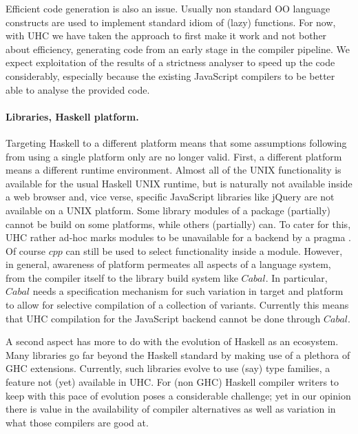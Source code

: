 \documentclass{llncs}
\newcommand{\Conid}[1]{\mathit{#1}}
\newcommand{\Varid}[1]{\mathit{#1}}
\begin{document}
Efficient code generation is also an issue.
Usually non standard OO language constructs are used to implement
standard idiom of (lazy) functions.
For now, with UHC we have taken the approach to first make it work and not bother about efficiency,
generating code from an early stage in the compiler pipeline.
We expect exploitation of the results of a strictness analyser to speed up the code considerably,
especially because the existing JavaScript compilers to be better able to analyse the provided code.

\paragraph{Libraries, Haskell platform.}

Targeting Haskell to a different platform means that some assumptions following
from using a single platform only are no longer valid.
First, a different platform means a different runtime environment.
Almost all of the UNIX functionality is available for the usual Haskell UNIX runtime, but is
naturally  not available inside a web browser
and, vice verse, specific JavaScript libraries like jQuery are not available on a UNIX platform.
Some library modules of a package (partially) cannot be build on some platforms, while others (partially) can.
To cater for this, UHC rather ad-hoc marks modules to be unavailable for a backend by a pragma
.
Of course \ensuremath{\Varid{cpp}} can still be used to select functionality inside a module.
However, in general, awareness of platform permeates all aspects of a language system, from the compiler itself
to the library build system like \ensuremath{\Conid{Cabal}}.
In particular, \ensuremath{\Conid{Cabal}} needs a specification mechanism for such variation in target and platform
to allow for selective compilation of a collection of variants.
Currently this means that UHC compilation for the JavaScript backend cannot be done through \ensuremath{\Conid{Cabal}}.

A second aspect has more to do with the evolution of Haskell as an ecosystem.
Many libraries go far beyond the Haskell standard by making use of a plethora of GHC extensions.
Currently, such libraries evolve to use (say) type families, a feature not (yet) available in UHC.
For (non GHC) Haskell compiler writers to keep with this pace of evolution poses a considerable challenge;
yet in our opinion there is value in the availability of compiler alternatives as well as variation in what those
compilers are good at.
\end{document}
